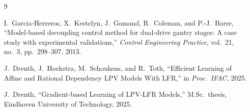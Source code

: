 ﻿\documentclass[11pt]{article}
\begin{document}
\newpage
\begin{thebibliography}{9}

I.~Garcia-Herreros, X.~Kestelyn, J.~Gomand, R.~Coleman, and P.-J.~Barre,
``Model-based decoupling control method for dual-drive gantry stages:
A case study with experimental validations,''
\textit{Control Engineering Practice}, vol.~21, no.~3, pp.~298--307, 2013.

J.~Drenth, J.~Hoekstra, M.~Schoukens, and R.~Toth,
``Efficient Learning of Affine and Rational Dependency LPV Models With LFR,''
in \textit{Proc.\ IFAC}, 2025.

J.~Drenth,
``Gradient-based Learning of LPV-LFR Models,''
M.Sc.\ thesis, Eindhoven University of Technology, 2025.

\end{thebibliography}
\end{document}
